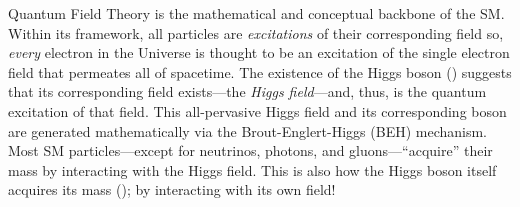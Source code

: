 Quantum Field Theory is the mathematical and conceptual backbone of the SM.
Within its framework, all particles are \emph{excitations} of their corresponding field so, \eg \emph{every} electron in the Universe is thought to be an excitation of the single electron field that permeates all of spacetime.
The existence of the Higgs boson (\PH) suggests that its corresponding field exists---the \emph{Higgs field}---and, thus, \PH is the quantum excitation of that field.
This all-pervasive Higgs field and its corresponding boson are generated mathematically via the Brout-Englert-Higgs (BEH) mechanism.
Most SM particles---except for neutrinos, photons, and gluons---``acquire'' their mass by interacting with the Higgs field.
This is also how the Higgs boson itself acquires its mass (\mH); by interacting with its own field!

